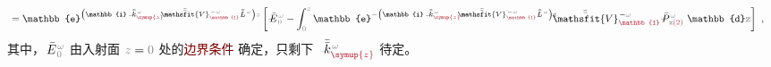 \begin{align}
	&= \mathbb{e}^{\left( \mathbb{i} \Xint{\begin{smallmatrix} ~ \\ {}^{}_{\mathcolor{gray}{-}} \\ ~ \end{smallmatrix}}{15}{\bar{\bar{k}}}_{\textcolor{Maroon}{\symup{z}}}^{\;\! \mathcolor{gray}{\omega}} - \Xint{\mathcolor{gray}{-}}{25}{\bar{\bar{\mathsfit{V}}}}^{\;\! - \mathcolor{gray}{\omega}}_{\textcolor{Maroon}{\mathbb{1}}} \Xint{\mathcolor{gray}{-}}{32}{\bar{\bar{L}}}^{\;\! \mathcolor{gray}{\omega}} \right) \mathcolor{gray}{z}} \left[ \Xint{\mathcolor{gray}{-}}{295}{\bar{E}}^{\;\!\mathcolor{gray}{\omega}}_{\;\! \mathcolor{gray}{0}} - \int_{\mathcolor{gray}{0}}^{\mathcolor{gray}{z}} \mathbb{e}^{- \left( \mathbb{i} \Xint{\begin{smallmatrix} ~ \\ {}^{}_{\mathcolor{gray}{-}} \\ ~ \end{smallmatrix}}{15}{\bar{\bar{k}}}_{\textcolor{Maroon}{\symup{z}}}^{\;\! \mathcolor{gray}{\omega}} - \Xint{\mathcolor{gray}{-}}{25}{\bar{\bar{\mathsfit{V}}}}^{\;\! - \mathcolor{gray}{\omega}}_{\textcolor{Maroon}{\mathbb{1}}} \Xint{\mathcolor{gray}{-}}{32}{\bar{\bar{L}}}^{\;\! \mathcolor{gray}{\omega}} \right) \mathcolor{gray}{\mathtt{z}}} \cdot \Xint{\mathcolor{gray}{-}}{25}{\bar{\bar{\mathsfit{V}}}}^{\;\! - \mathcolor{gray}{\omega}}_{\textcolor{Maroon}{\mathbb{1}}} \Xint{\mathcolor{gray}{-}}{30}{\bar{P}}^{\;\! \mathcolor{gray}{\omega}}_{\;\! \mathcolor{gray}{\mathtt{z}} \textcolor{Maroon}{(2)}} ~\mathbb{d} \mathcolor{gray}{\mathtt{z}} \right] ~, \label{eq:simplify6-SVA-E'-V_1nonsingular-solution}
\end{align}
其中，$\Xint{\mathcolor{gray}{-}}{25}{\bar{E}}^{\;\!\mathcolor{gray}{\omega}}_{\;\! \mathcolor{gray}{0}}$ 由入射面 $\mathcolor{gray}{z \mathcolor{black}{=} 0}$ 处的\textcolor{Maroon}{边界条件}  确定，只剩下 $\Xint{\begin{smallmatrix} ~ \\ {}^{}_{\mathcolor{gray}{-}} \\ ~ \end{smallmatrix}}{15}{\bar{\bar{k}}}_{\textcolor{Maroon}{\symup{z}}}^{\;\! \mathcolor{gray}{\omega}}$ 待定。

